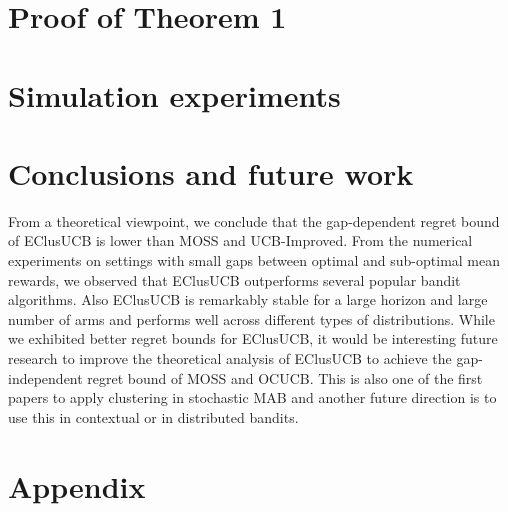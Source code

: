 \documentclass{article}
\begin{document}
\section{Proof of Theorem 1}
\label{sec:proofTheorem}

%
\vspace*{-1.6em}
\section{Simulation experiments}
\label{sec:expts}
\vspace*{-0.7em}

%
\vspace*{-1.6em}
\section{Conclusions and future work}
\label{sec:conclusions}
\vspace*{-0.7em}
From a theoretical viewpoint, we conclude that the gap-dependent regret bound of EClusUCB is lower than MOSS and UCB-Improved. From the numerical experiments on settings with small gaps between optimal and sub-optimal mean rewards, we observed that EClusUCB outperforms several popular bandit algorithms. Also EClusUCB is remarkably stable for a large horizon and large number of arms and performs well across different types of distributions. While we exhibited better regret bounds for EClusUCB, it would be interesting future research to improve the theoretical analysis of EClusUCB to achieve the gap-independent regret bound of MOSS and OCUCB. This is also one of the first papers to apply clustering in stochastic MAB and another future direction is to use this in contextual or in distributed bandits.


\clearpage
\newpage






\clearpage
\newpage
\onecolumn
\section*{Appendix}

\end{document}
